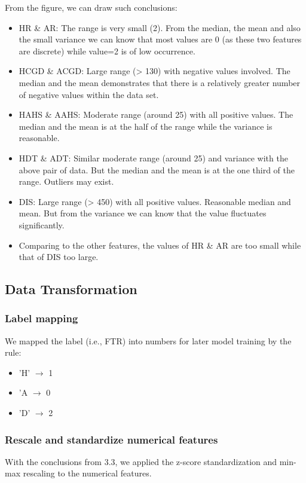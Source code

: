 \documentclass{article}
\begin{document}
From the figure, we can draw such conclusions:
\begin{itemize}
\item HR \& AR: The range is very small (2). From the median, the mean and also the small variance we can know that most values are 0 (as these two features are discrete) while value=2 is of low occurrence.
\item HCGD \& ACGD: Large range (> 130) with negative values involved. The median and the mean demonstrates that there is a relatively greater number of negative values within the data set.
\item HAHS \& AAHS: Moderate range (around 25) with all positive values. The median and the mean is at the half of the range while the variance is reasonable.
\item HDT \& ADT: Similar moderate range (around 25) and variance with the above pair of data. But the median and the mean is at the one third of the range. Outliers may exist.
\item DIS: Large range (> 450) with all positive values. Reasonable median and mean. But from the variance we can know that the value fluctuates significantly.
\item Comparing to the other features, the values of HR \& AR are too small while that of DIS too large.
\end{itemize}

\subsection{Data Transformation}
\subsubsection{Label mapping}
We mapped the label (i.e., FTR) into numbers for later model training by the rule:
\begin{itemize}
\item 'H' $\to$ 1
\item 'A $\to$ 0
\item 'D' $\to$ 2
\end{itemize}

\subsubsection{Rescale and standardize numerical features} \label{`}
With the conclusions from 3.3, we applied the z-score standardization and min-max rescaling to the numerical features.
\end{document}
